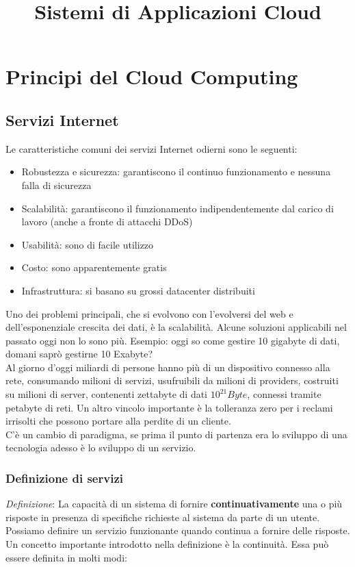 \documentclass{article}
\title{Sistemi di Applicazioni Cloud}
\begin{document}
		\maketitle
		
		\section{Principi del Cloud Computing}
		
		\subsection{Servizi Internet}
		Le caratteristiche comuni dei servizi Internet odierni sono le seguenti:
		
		\begin{itemize}
		    \item Robustezza e sicurezza: garantiscono il continuo funzionamento e nessuna falla di sicurezza
		    \item Scalabilità: garantiscono il funzionamento indipendentemente dal carico di lavoro (anche a fronte di attacchi DDoS)
		    \item Usabilità: sono di facile utilizzo
		    \item Costo: sono apparentemente gratis
		    \item Infrastruttura: si basano su grossi datacenter distribuiti
		\end{itemize}
		
		Uno dei problemi principali, che si evolvono con l'evolversi del web e dell'esponenziale crescita dei dati, è la scalabilità.
		Alcune soluzioni applicabili nel passato oggi non lo sono più. Esempio: oggi so come gestire 10 gigabyte di dati, domani saprò gestirne 10 Exabyte?\\
		Al giorno d'oggi miliardi di persone hanno più di un dispositivo connesso alla rete, consumando milioni di servizi, usufruibili da milioni di providers, costruiti su milioni di server, contenenti zettabyte di dati $10^{21} Byte$, connessi tramite petabyte di reti.
		Un altro vincolo importante è la tolleranza zero per i reclami irrisolti che possono portare alla perdite di un cliente. \\
		C'è un cambio di paradigma, se prima il punto di partenza era lo sviluppo di una tecnologia adesso è lo sviluppo di un servizio.
		
		\subsubsection{Definizione di servizi}
		\emph{Definizione}: La capacità di un sistema di fornire \textbf{continuativamente} una o più risposte in presenza di specifiche richieste al sistema da parte di un utente.\\
		Possiamo definire un servizio funzionante quando continua a fornire delle risposte. Un concetto importante introdotto nella definizione è la continuità. Essa può essere definita in molti modi:
		
\end{document}
